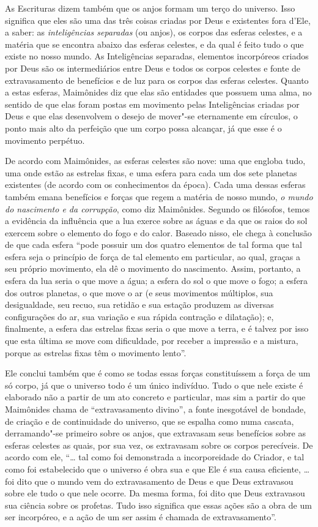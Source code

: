 As Escrituras dizem também que os anjos formam um terço do universo.
Isso significa que eles são uma das três coisas criadas por Deus e
existentes fora d'Ele, a saber: as \emph{inteligências separadas} (ou anjos),
os corpos das esferas celestes, e a matéria que se encontra abaixo das
esferas celestes, e da qual é feito tudo o que existe no nosso mundo. As
Inteligências separadas, elementos incorpóreos criados por Deus são os
intermediários entre Deus e todos os corpos celestes e fonte de
extravasamento de benefícios e de luz para os corpos das esferas
celestes. Quanto a estas esferas, Maimônides diz que elas são entidades
que possuem uma alma, no sentido de que elas foram postas em movimento
pelas Inteligências criadas por Deus e que elas desenvolvem o desejo de
mover"-se eternamente em círculos, o ponto mais alto da perfeição que um
corpo possa alcançar, já que esse é o movimento perpétuo.

De acordo com Maimônides, as esferas celestes são nove: uma
que engloba tudo, uma onde estão as estrelas fixas, e uma esfera para
cada um dos sete planetas existentes (de acordo com os conhecimentos da
época). Cada uma dessas esferas também emana benefícios e forças que
regem a matéria de nosso mundo, \emph{o mundo do nascimento e da
corrupção}, como diz Maimônides. Segundo os filósofos, temos a
evidência da influência que a lua exerce sobre as águas e da que os
raios do sol exercem sobre o elemento do fogo e do calor. Baseado
nisso, ele chega à conclusão de que cada esfera ``pode possuir um dos
quatro elementos de tal forma que tal esfera seja o princípio de força
de tal elemento em particular, ao qual, graças a seu próprio movimento,
ela dê o movimento do nascimento. Assim, portanto, a esfera da lua seria
o que move a água; a esfera do sol o que move o fogo; a esfera dos
outros planetas, o que move o ar (e seus movimentos múltiplos, sua
desigualdade, seu recuo, sua retidão e sua estação produzem as diversas
configurações do ar, sua variação e sua rápida contração e dilatação);
e, finalmente, a esfera das estrelas fixas seria o que move a terra, e é
talvez por isso que esta última se move com dificuldade, por receber a
impressão e a mistura, porque as estrelas fixas têm o movimento
lento''.

Ele conclui também que é como se todas essas forças constituíssem a
força de um só corpo, já que o universo todo é um único indivíduo. Tudo
o que nele existe é elaborado não a partir de um ato concreto e
particular, mas sim a partir do que Maimônides chama de ``extravasamento
divino'', a fonte inesgotável de bondade, de criação e de continuidade
do universo, que se espalha como numa cascata, derramando"-se primeiro
sobre os anjos, que extravasam seus benefícios sobre as esferas
celestes as quais, por sua vez, os extravasam sobre os corpos
perecíveis. De acordo com ele, ``\ldots{} tal como foi demonstrada a
incorporeidade do Criador, e tal como foi estabelecido que o universo é
obra sua e que Ele é sua causa eficiente, \ldots{} foi dito que o mundo vem
do extravasamento de Deus e que Deus extravasou sobre ele tudo o que
nele ocorre. Da mesma forma, foi dito que Deus extravasou sua ciência
sobre os profetas. Tudo isso significa que essas ações são a obra de um
ser incorpóreo, e a ação de um ser assim é chamada de extravasamento''.

